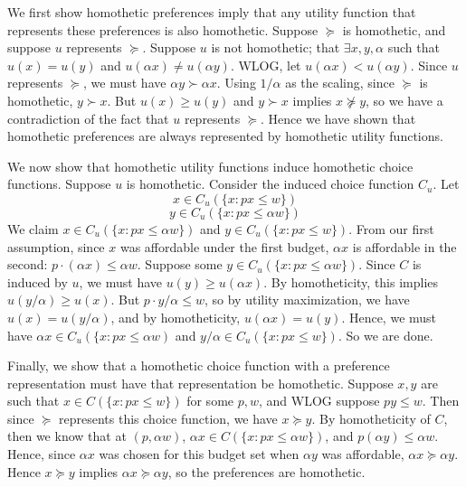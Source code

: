 \documentclass[10pt,letter]{article}
\begin{document}
We first show homothetic preferences imply that any utility function that represents these preferences is also homothetic. Suppose $\succeq$ is homothetic, and suppose $u$ represents $\succeq$. Suppose $u$ is not homothetic; that $\exists x, y, \alpha$ such that $u(x) = u(y)$ and $u(\alpha x) \neq u(\alpha y)$. WLOG, let  $u(\alpha x) < u(\alpha y)$. Since $u$ represents $\succeq$, we must have $\alpha y \succ \alpha x$. Using $1/\alpha$ as the scaling, since $\succeq$ is homothetic, $ y \succ x$. But $u(x) \ge u(y)$ and $y \succ x$ implies $x \not \succeq y$, so we have a contradiction of the fact that $u$ represents $\succeq$. Hence we have shown that homothetic preferences are always represented by homothetic utility functions.

We now show that homothetic utility functions induce homothetic choice functions. Suppose $u$ is homothetic. Consider the induced choice function $C_u$. Let
\[ x \in C_u(\{ x : px \le w \}) \]
\[ y \in C_u(\{ x: px \le \alpha w \}) \]
We claim $x \in C_u(\{ x: px \le \alpha w \})$ and $y \in C_u(\{ x : px \le w \})$. From our first assumption, since $x$ was affordable under the first budget, $\alpha x$ is affordable in the second: $p \cdot (\alpha x) \le \alpha w$. Suppose some $y \in C_u(\{ x: px \le \alpha w \})$. Since $C$ is induced by $u$, we must have $u(y) \ge u(\alpha x)$. By homotheticity, this implies $u(y/\alpha) \ge u( x)$. But $p \cdot y/\alpha \le w$, so by utility maximization, we have $u(x) = u(y/\alpha)$, and by homotheticity, $u(\alpha x) = u(y)$. Hence, we must have $\alpha x \in C_u(\{ x : px \le \alpha w)$ and $y/\alpha \in C_u(\{ x: px \le w \})$. So we are done.

Finally, we show that a homothetic choice function with a preference representation must have that representation be homothetic. Suppose $x, y$ are such that $x \in C(\{ x: px \le w \})$ for some $p, w$, and WLOG suppose $py \le w$. Then since $\succeq$ represents this choice function, we have $x \succeq y$. By homotheticity of $C$, then we know that at $(p, \alpha w)$, $\alpha x \in C(\{ x : px \le \alpha w \})$, and $p(\alpha y) \le \alpha w$. Hence, since $\alpha x$ was chosen for this budget set when $\alpha y$ was affordable, $\alpha x \succeq \alpha y$. Hence $x\succeq y$ implies $\alpha x \succeq \alpha y$, so the preferences are homothetic.
\end{document}
